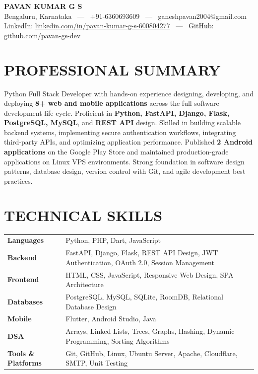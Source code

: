 \documentclass[10.5pt,a4paper]{article}
\begin{document}
\begin{center}
{\Huge \textbf{PAVAN KUMAR G S}}\\[4pt]
\textcolor{subtext}{Bengaluru, Karnataka \ — \ +91-6360693609 \ — \ ganeshpavan2004@gmail.com}\\[1pt]
\textcolor{subtext}{LinkedIn: \href{https://linkedin.com/in/pavan-kumar-g-s-600804277}{linkedin.com/in/pavan-kumar-g-s-600804277} \ — \ GitHub: \href{https://github.com/pavan-gs-dev}{github.com/pavan-gs-dev}}
\end{center}
\vspace{-10pt}

\section*{PROFESSIONAL SUMMARY}
Python Full Stack Developer with hands-on experience designing, developing, and deploying \textbf{8+ web and mobile applications} across the full software development life cycle. Proficient in \textbf{Python, FastAPI, Django, Flask, PostgreSQL, MySQL}, and \textbf{REST API} design. Skilled in building scalable backend systems, implementing secure authentication workflows, integrating third-party APIs, and optimizing application performance. Published \textbf{2 Android applications} on the Google Play Store and maintained production-grade applications on Linux VPS environments. Strong foundation in software design patterns, database design, version control with Git, and agile development best practices.

\section*{TECHNICAL SKILLS}
\begin{tabularx}{\textwidth}{@{}>{\bfseries}l X@{}}
Languages         & Python, PHP, Dart, JavaScript \\
Backend           & FastAPI, Django, Flask, REST API Design, JWT Authentication, OAuth 2.0, Session Management \\
Frontend          & HTML, CSS, JavaScript, Responsive Web Design, SPA Architecture \\
Databases         & PostgreSQL, MySQL, SQLite, RoomDB, Relational Database Design \\
Mobile            & Flutter, Android Studio, Java \\
DSA               & Arrays, Linked Lists, Trees, Graphs, Hashing, Dynamic Programming, Sorting Algorithms \\
Tools \& Platforms & Git, GitHub, Linux, Ubuntu Server, Apache, Cloudflare, SMTP, Unit Testing \\
\end{tabularx}
\end{document}
